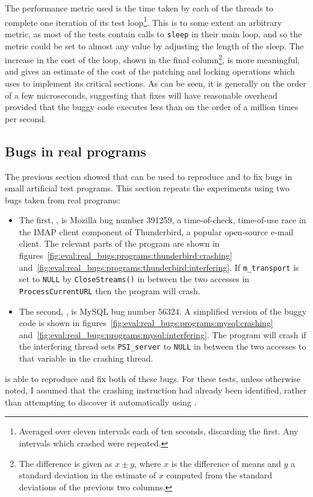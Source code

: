 The performance metric used is the time taken by each of the threads
to complete one iteration of its test loop\footnote{Averaged over
  eleven intervals each of ten seconds, discarding the first.  Any
  intervals which crashed were repeated. }.  This is to some extent an arbitrary metric, as
most of the tests contain calls to \texttt{sleep} in their main loop,
and so the metric could be set to almost any value by adjusting the
length of the sleep.  The increase in the cost of the loop, shown in
the final column\footnote{The difference is given as $x \pm y$, where
  $x$ is the difference of means and $y$ a standard deviation in the
  estimate of $x$ computed from the standard deviations of the
  previous two columns.}, is more meaningful, and gives an estimate of
the cost of the patching and locking operations which
{\implementation} uses to implement its critical sections.  As can be
seen, it is generally on the order of a few microseconds, suggesting
that {\technique} fixes will have reasonable overhead provided that
the buggy code executes less than on the order of a million times per
second.

\subsection{Bugs in real programs}

The previous section showed that {\technique} can be used to reproduce
and to fix bugs in small artificial test programs.  This section
repeats the experiments using two bugs taken from real programs:
\begin{itemize}
\item The first, , is Mozilla bug number
  391259\cite{Mery2007}, a time-of-check, time-of-use race in the IMAP
  client component of Thunderbird, a popular open-source e-mail
  client.  The relevant parts of the program are shown in
  figures~\ref{fig:eval:real_bugs:programs:thunderbird:crashing}
  and~\ref{fig:eval:real_bugs:programs:thunderbird:interfering}.  If
  \verb|m_transport| is set to \verb|NULL| by \verb|CloseStreams()| in
  between the two accesses in \verb|ProcessCurrentURL| then the
  program will crash.
\item The second, , is MySQL bug number
  56324\needCite{}.  A simplified version of the buggy code is shown
  in figures~\ref{fig:eval:real_bugs:programs:mysql:crashing}
  and~\ref{fig:eval:real_bugs:programs:mysql:interfering}.  The
  program will crash if the interfering thread sets
  \texttt{PSI\_server} to \texttt{NULL} in between the two accesses to
  that variable in the crashing thread.
\end{itemize}
{\Technique} is able to reproduce and fix both of these bugs.  For
these tests, unless otherwise noted, I assumed that the crashing
instruction had already been identified, rather than attempting to
discover it automatically using {\technique}.

